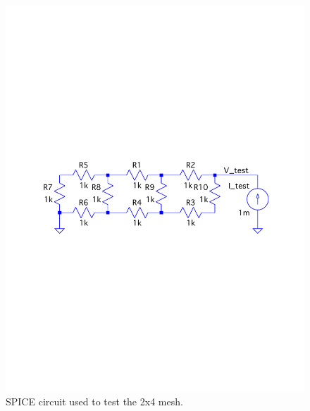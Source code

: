 \documentclass[a4paper,titlepage]{article}
\begin{document}
	\begin{figure}[!htb]
		\centering
		\includegraphics[width=\columnwidth]{plots/q2a_mesh_2.pdf}
		\caption
		{SPICE circuit used to test the 2x4 mesh.}
		\label{fig:q2a_mesh_2}
	\end{figure}
\end{document}

